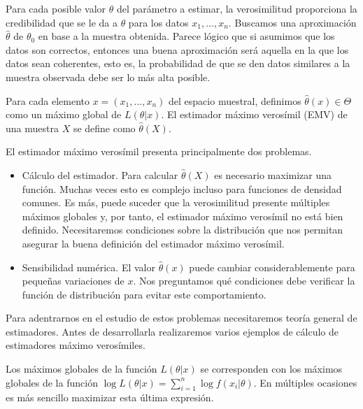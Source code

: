 \documentclass{article}
\begin{document}
    Para cada posible valor $\theta$ del parámetro a estimar, la verosimilitud proporciona la credibilidad que se le da a $\theta$ para los datos $x_1, \ldots, x_n$. Buscamos una aproximación $\hat{\theta}$ de $\theta_0$ en base a la muestra obtenida. Parece lógico que si asumimos que los datos son correctos, entonces una buena aproximación será aquella en la que los datos sean coherentes, esto es, la probabilidad de que se den datos similares a la muestra observada debe ser lo más alta posible.

    \begin{definition}
        Para cada elemento $x = (x_1, \ldots, x_n)$ del espacio muestral, definimos $\hat{\theta}(x) \in \Theta$ como un máximo global de $L(\theta | x)$. El estimador máximo verosímil (EMV) de una muestra $X$ se define como $\hat{\theta}(X)$.
    \end{definition}

    El estimador máximo verosímil presenta principalmente dos problemas.
    \begin{itemize}
        \item Cálculo del estimador. Para calcular $\hat{\theta}(X)$ es necesario maximizar una función. Muchas veces esto es complejo incluso para funciones de densidad comunes. Es más, puede suceder que la verosimilitud presente múltiples máximos globales y, por tanto, el estimador máximo verosímil no está bien definido. Necesitaremos condiciones sobre la distribución que nos permitan asegurar la buena definición del estimador máximo verosímil.
        \item Sensibilidad numérica. El valor $\hat{\theta}(x)$ puede cambiar considerablemente para pequeñas variaciones de $x$. Nos preguntamos qué condiciones debe verificar la función de distribución para evitar este comportamiento.
    \end{itemize}

    Para adentrarnos en el estudio de estos problemas necesitaremos teoría general de estimadores. Antes de desarrollarla realizaremos varios ejemplos de cálculo de estimadores máximo verosímiles.

    \begin{remark} \label{rem:emv:log}
        Los máximos globales de la función $L(\theta | x)$ se corresponden con los máximos globales de la función $\log L(\theta | x) = \sum_{i = 1}^n \log f(x_i | \theta)$. En múltiples ocasiones es más sencillo maximizar esta última expresión.
    \end{remark}
\end{document}

